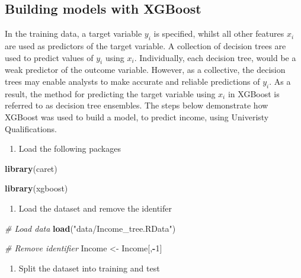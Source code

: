 \documentclass[]{book}
\newenvironment{Shaded}{\begin{snugshade}}{\end{snugshade}}
\newcommand{\KeywordTok}[1]{\textcolor[rgb]{0.13,0.29,0.53}{\textbf{#1}}}
\newcommand{\DecValTok}[1]{\textcolor[rgb]{0.00,0.00,0.81}{#1}}
\newcommand{\StringTok}[1]{\textcolor[rgb]{0.31,0.60,0.02}{#1}}
\newcommand{\CommentTok}[1]{\textcolor[rgb]{0.56,0.35,0.01}{\textit{#1}}}
\newcommand{\OperatorTok}[1]{\textcolor[rgb]{0.81,0.36,0.00}{\textbf{#1}}}
\newcommand{\NormalTok}[1]{#1}
\providecommand{\tightlist}{%
  \setlength{\itemsep}{0pt}\setlength{\parskip}{0pt}}
\begin{document}
\subsection{Building models with
XGBoost}\label{building-models-with-xgboost}

In the training data, a target variable \(y_{i}\) is specified, whilst
all other features \(x_{i}\) are used as predictors of the target
variable. A collection of decision trees are used to predict values of
\(y_{i}\) using \(x_{i}\). Individually, each decision tree, would be a
weak predictor of the outcome variable. However, as a collective, the
decision trees may enable analysts to make accurate and reliable
predictions of \(y_{i}\). As a result, the method for predicting the
target variable using \(x_{i}\) in XGBoost is referred to as decision
tree ensembles. The steps below demonstrate how XGBoost was used to
build a model, to predict income, using Univeristy Qualifications.

\begin{enumerate}
\def\labelenumi{\arabic{enumi})}
\tightlist
\item
  Load the following packages
\end{enumerate}

\begin{Shaded}
\begin{Highlighting}[]
\KeywordTok{library}\NormalTok{(caret)}

\KeywordTok{library}\NormalTok{(xgboost)}
\end{Highlighting}
\end{Shaded}

\begin{enumerate}
\def\labelenumi{\arabic{enumi})}
\setcounter{enumi}{1}
\tightlist
\item
  Load the dataset and remove the identifer
\end{enumerate}

\begin{Shaded}
\begin{Highlighting}[]
\CommentTok{# Load data}
\KeywordTok{load}\NormalTok{(}\StringTok{"data/Income_tree.RData"}\NormalTok{)}

\CommentTok{# Remove identifier}
\NormalTok{Income <-}\StringTok{ }\NormalTok{Income[,}\OperatorTok{-}\DecValTok{1}\NormalTok{]}
\end{Highlighting}
\end{Shaded}

\begin{enumerate}
\def\labelenumi{\arabic{enumi})}
\setcounter{enumi}{2}
\tightlist
\item
  Split the dataset into training and test
\end{enumerate}
\end{document}
